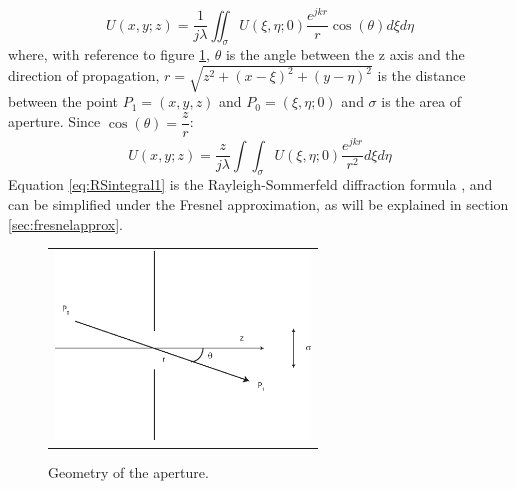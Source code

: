 	\begin{equation}
	\label{eq:RSintegral}
	U(x,y;z)=\dfrac{1}{j\lambda}\iint_{\sigma}^{}U(\xi,\eta;0)\dfrac{e^{jkr}}{r} \cos(\theta) d\xi d\eta
		\end{equation}
		where, with reference to figure \ref{fig:RS}, $\theta$ is the angle between the z axis and the direction of propagation, $r=\sqrt{z^2+(x-\xi)^2+(y-\eta)^2}$ is the distance between the point $P_1=(x,y,z)$ and $P_0=(\xi,\eta;0)$ and $\sigma$ is the area of aperture. Since $\cos(\theta)=\dfrac{z}{r}$:
		\begin{equation}
		\label{eq:RSintegral1}
		U(x,y;z)=\dfrac{z}{j\lambda}\int\int_{\sigma}^{}U(\xi,\eta;0)\dfrac{e^{jkr}}{r^2} d\xi d\eta
		\end{equation}
		Equation \ref{eq:RSintegral1} is the Rayleigh-Sommerfeld diffraction formula \cite{goodman2005introduction}, and can be simplified under the Fresnel approximation, as will be explained in section \ref{sec:fresnelapprox}.
		\begin{figure}[H]
			\begin{center}
				\begin{tabular}{c}
					\includegraphics[height=5cm]{RS.eps}
				\end{tabular}
			\end{center}
			\caption{ \label{fig:RS} 
				Geometry of the aperture. }
		\end{figure} 
